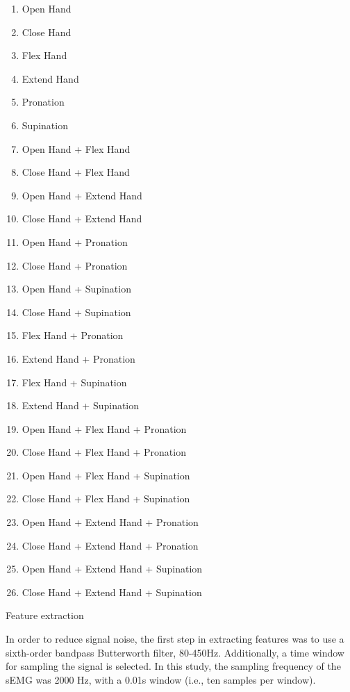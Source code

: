 \documentclass[a4paper, 12pt]{ppgeb}
\makeatletter
\renewcommand{\subsection}{\@startsection
{subsection}
{2}
{0mm}
{-\baselineskip}
{0.5\baselineskip}
{\bf\sffamily}}
\makeatother
\begin{document}
\begin{enumerate}
    \item Open Hand
    \item Close Hand
    \item Flex Hand
    \item Extend Hand
    \item Pronation
    \item Supination
    \item Open Hand + Flex Hand
    \item Close Hand + Flex Hand
    \item Open Hand + Extend Hand
    \item Close Hand + Extend Hand
    \item Open Hand + Pronation
    \item Close Hand + Pronation
    \item Open Hand + Supination
    \item Close Hand + Supination
    \item Flex Hand + Pronation
    \item Extend Hand + Pronation
    \item Flex Hand + Supination
    \item Extend Hand + Supination
    \item Open Hand + Flex Hand + Pronation
    \item Close Hand + Flex Hand + Pronation
    \item Open Hand + Flex Hand + Supination
    \item Close Hand + Flex Hand + Supination
    \item Open Hand + Extend Hand + Pronation
    \item Close Hand + Extend Hand + Pronation
    \item Open Hand + Extend Hand + Supination
    \item Close Hand + Extend Hand + Supination
\end{enumerate}

\subsection{Feature extraction}

In order to reduce signal noise, the first step in extracting features was to use a sixth-order bandpass Butterworth filter, 80-450Hz. Additionally, a time window for sampling the signal is selected. In this study, the sampling frequency of the sEMG was 2000 Hz, with a 0.01s window (i.e., ten samples per window).
\end{document}
